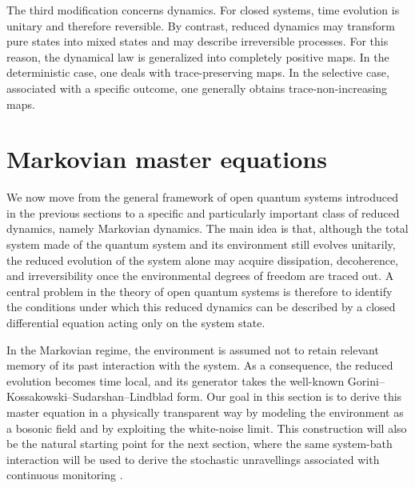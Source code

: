 The third modification concerns dynamics. For closed systems, time evolution is unitary and therefore reversible. By contrast, reduced dynamics may transform pure states into mixed states and may describe irreversible processes. For this reason, the dynamical law is generalized into completely positive maps. In the deterministic case, one deals with trace-preserving maps. In the selective case, associated with a specific outcome, one generally obtains trace-non-increasing maps.




\section{Markovian master equations}
\label{sec:derivation_markovian_master_equations}

We now move from the general framework of open quantum systems introduced in the previous sections to a specific and particularly important class of reduced dynamics, namely Markovian dynamics. The main idea is that, although the total system made of the quantum system and its environment still evolves unitarily, the reduced evolution of the system alone may acquire dissipation, decoherence, and irreversibility once the environmental degrees of freedom are traced out. A central problem in the theory of open quantum systems is therefore to identify the conditions under which this reduced dynamics can be described by a closed differential equation acting only on the system state.

In the Markovian regime, the environment is assumed not to retain relevant memory of its past interaction with the system. As a consequence, the reduced evolution becomes time local, and its generator takes the well-known Gorini--Kossakowski--Sudarshan--Lindblad form. Our goal in this section is to derive this master equation in a physically transparent way by modeling the environment as a bosonic field and by exploiting the white-noise limit. This construction will also be the natural starting point for the next section, where the same system-bath interaction will be used to derive the stochastic unravellings associated with continuous monitoring \cite{Vac24,ParisTools12,GenAlb01,WisMil10,Wi}.

